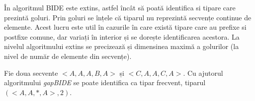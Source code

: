 În \cite{bib:gapbide} algoritmul BIDE este extins, astfel încât să poată identifica si tipare care prezintă goluri. Prin goluri se înțele că tiparul nu reprezintă secvențe continue de elemente. Acest lucru este util în cazurile în care există tipare care au prefixe si postfixe comune, dar variați în interior și se dorește identificarea acestora. La nivelul algoritmului extins se precizează și dimensinea maximă a golurilor (la nivel de număr de elemente din secvențe). 

\begin{ex}  
Fie doua secvente $<A, A, A, B, A>$ și $<C, A, A, C, A>$. Cu ajutorul algoritmului \textit{gapBIDE} se poate identifica ca tipar frecvent, tiparul $(<A, A, *, A>, 2)$.
\end{ex}